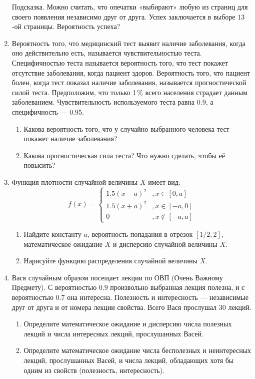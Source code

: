 \documentclass[12pt, a4paper]{article}\usepackage[]{graphicx}\usepackage[]{color}
\begin{document}
\begin{enumerate}
					Подсказка.  Можно считать, что опечатки «выбирают» любую из страниц для своего появления независимо друг от друга. Успех заключается в выборе $13$-ой страницы. Вероятность успеха?

					\item Вероятность того, что медицинский тест выявит наличие заболевания, когда оно действительно есть, называется чувствительностью теста. Специфичностью теста называется вероятность того, что тест покажет отсутствие заболевания, когда пациент здоров. Вероятность того, что пациент болен, когда тест показал наличие заболевания, называется прогностической силой теста. Предположим, что только 1\,\%  всего населения страдает данным заболеванием.  Чувствительность используемого теста равна $0.9$, а специфичность — $0.95$.
					\begin{enumerate}
						\item Какова вероятность того, что у случайно выбранного человека тест покажет наличие заболевания?
						\item Какова прогностическая сила теста? Что нужно сделать, чтобы её повысить?
					\end{enumerate}

					\item Функция плотности случайной величины $X$ имеет вид:
					\begin{equation*}
					f(x) =
					\begin{cases}
					1.5 (x-a)^2 &, x \in [0,a]\\
					1.5 (x+a)^2 &, x \in [-a,0]\\
					0 &, x \not\in [-a,a]
					\end{cases}
					\end{equation*}

					\begin{enumerate}
						\item Найдите константу $a$, вероятность попадания в отрезок $\left[1/2, 2 \right]$, математическое ожидание $X$ и дисперсию случайной величины $X$.
						\item Нарисуйте функцию распределения случайной величины $X$.
					\end{enumerate}

					\item Вася случайным образом посещает лекции по ОВП (Очень Важному Предмету). С вероятностью $0.9$ произвольно выбранная лекция полезна, и с вероятностью $0.7$ она интересна. Полезность и интересность –-- независимые друг от друга и от номера лекции свойства. Всего Вася прослушал 30 лекций.
					\begin{enumerate}
						\item Определите математическое ожидание и дисперсию числа полезных лекций и числа интересных лекций, прослушанных Васей.
						\item Определите математическое ожидание числа бесполезных и неинтересных лекций, прослушанных Васей, и числа лекций, обладающих хотя бы одним из свойств (полезность,  интересность).
					\end{enumerate}


\end{enumerate}
\end{document}
